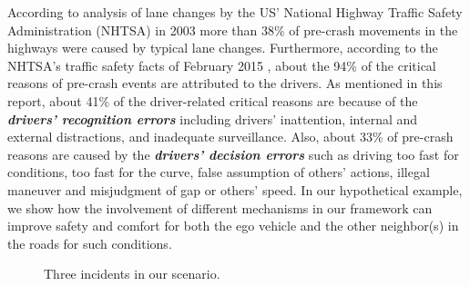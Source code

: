 \documentclass[journal, 11pt]{IEEEtran}
\begin{document}
According to analysis of lane changes by the US' National Highway Traffic
Safety Administration (NHTSA) in 2003 \cite{nhtsa:lane-change} more than
38\% of pre-crash movements in the highways were caused by typical lane changes.
Furthermore, according to the NHTSA's traffic safety facts of February 2015
\cite{nhtsa:crash-stats}, about the 94\% of the critical reasons of
pre-crash events are attributed to the drivers. As mentioned in this report,
about 41\% of the driver-related critical reasons are because of the
\textit{\textbf{drivers' recognition errors}} including drivers' inattention,
internal and external distractions, and inadequate surveillance. Also, about
33\% of pre-crash reasons are caused by the \textit{\textbf{drivers' decision
errors}} such as driving too fast for conditions, too fast for the curve, false
assumption of others’ actions, illegal maneuver and misjudgment of gap or
others’ speed. In our hypothetical example, we show how the involvement of
different mechanisms in our framework can improve safety and comfort for both
the ego vehicle and the other neighbor(s) in the roads for such conditions.

\begin{figure}[!t]
  \begin{center}
  \caption{Three incidents in our scenario.}  
  \label{fig:threeScenarios}
  \end{center}
\end{figure}
\end{document}
